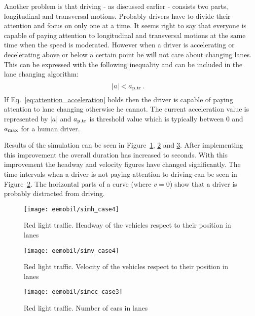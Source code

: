 		 Another problem is that driving - as discussed earlier - consists two parts, longitudinal and transversal motions. Probably drivers have to divide their attention and focus on only one at a time. It seems right to say that everyone is capable of paying attention to longitudinal and transversal motions at the same time when the speed is moderated. However when a driver is accelerating or decelerating above or below a certain point he will not care about changing lanes. This can be expressed with the  following inequality and can be included in the lane changing algorithm:
		\begin{equation}
			|a|<a_{\rm p,tr}\,.
			\label{eq:attention_acceleration}
		\end{equation}
		If Eq.~\eqref{eq:attention_acceleration} holds then the driver is capable of paying attention to lane changing otherwise he cannot. The current acceleration value is represented by $|a|$ and $a_{\rm p,tr}$ is threshold value which is typically between 0 and $a_{\rm max}$ for a human driver.
		
		Results of the simulation can be seen in Figure~\ref{fig:red_light_situationh_impr3}, \ref{fig:red_light_situationv_impr3} and \ref{fig:red_light_situationcc_impr3}. After implementing this improvement the overall duration has increased to seconds. With this improvement the headway and velocity figures have changed significantly. The time intervals when a driver is not paying attention to driving can be seen in Figure~\ref{fig:red_light_situationv_impr3}. The horizontal parts of a curve (where $\dot{v}=0$) show that a driver is probably distracted from driving.
		\begin{figure}
			\centering
			\texttt{[image: eemobil/simh\_case4]}
			\caption{Red light traffic. Headway of the vehicles respect to their position in lanes}
			\label{fig:red_light_situationh_impr3}
		\end{figure}
		\begin{figure}
			\centering
			\texttt{[image: eemobil/simv\_case4]}
			\caption{Red light traffic. Velocity of the vehicles respect to their position in lanes}
			\label{fig:red_light_situationv_impr3}
		\end{figure}
		\begin{figure}
			\centering
			\texttt{[image: eemobil/simcc\_case3]}
			\caption{Red light traffic. Number of cars in lanes }
			\label{fig:red_light_situationcc_impr3}
		\end{figure}